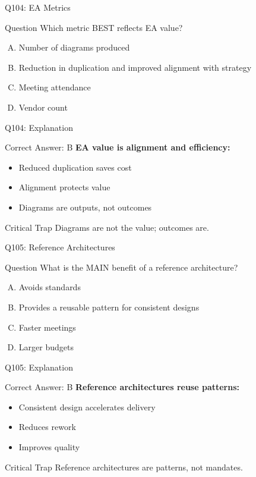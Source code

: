 \documentclass{beamer}
\begin{document}
	\begin{frame}{Q104: EA Metrics}
		\begin{block}{Question}
			Which metric BEST reflects EA value?
		\end{block}
		\begin{enumerate}[(A)]
			\item Number of diagrams produced
			\item Reduction in duplication and improved alignment with strategy
			\item Meeting attendance
			\item Vendor count
		\end{enumerate}
	\end{frame}
	
	\begin{frame}{Q104: Explanation}
		\begin{block}{Correct Answer: B}
			\textbf{EA value is alignment and efficiency:}
			\begin{itemize}
				\item Reduced duplication saves cost
				\item Alignment protects value
				\item Diagrams are outputs, not outcomes
			\end{itemize}
		\end{block}
		\begin{alertblock}{Critical Trap}
			Diagrams are not the value; outcomes are.
		\end{alertblock}
	\end{frame}
	
	\begin{frame}{Q105: Reference Architectures}
		\begin{block}{Question}
			What is the MAIN benefit of a reference architecture?
		\end{block}
		\begin{enumerate}[(A)]
			\item Avoids standards
			\item Provides a reusable pattern for consistent designs
			\item Faster meetings
			\item Larger budgets
		\end{enumerate}
	\end{frame}
	
	\begin{frame}{Q105: Explanation}
		\begin{block}{Correct Answer: B}
			\textbf{Reference architectures reuse patterns:}
			\begin{itemize}
				\item Consistent design accelerates delivery
				\item Reduces rework
				\item Improves quality
			\end{itemize}
		\end{block}
		\begin{alertblock}{Critical Trap}
			Reference architectures are patterns, not mandates.
		\end{alertblock}
	\end{frame}
	
\end{document}
